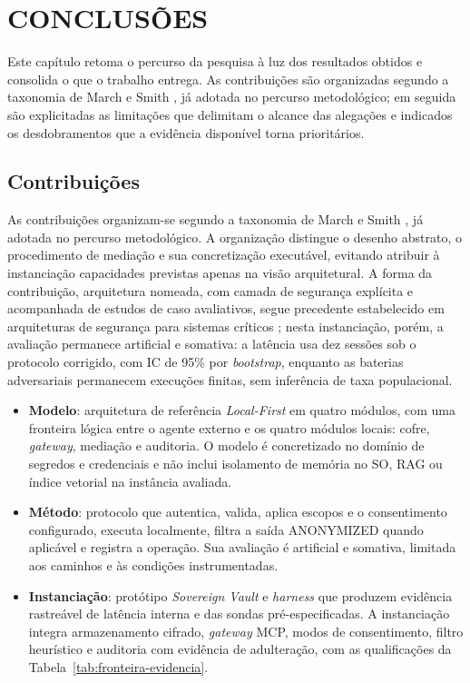 \documentclass[12pt,openright,twoside,a4paper,english,brazil]{abntex2}
\begin{document}
\chapter{CONCLUSÕES}
Este capítulo retoma o percurso da pesquisa à luz dos resultados obtidos e consolida o que o trabalho entrega. As contribuições são organizadas segundo a taxonomia de March e Smith \cite{march1995}, já adotada no percurso metodológico; em seguida são explicitadas as limitações que delimitam o alcance das alegações e indicados os desdobramentos que a evidência disponível torna prioritários.

\section{Contribuições}
As contribuições organizam-se segundo a taxonomia de March e Smith \cite{march1995}, já adotada no percurso metodológico. A organização distingue o desenho abstrato, o procedimento de mediação e sua concretização executável, evitando atribuir à instanciação capacidades previstas apenas na visão arquitetural. A forma da contribuição, arquitetura nomeada, com camada de segurança explícita e acompanhada de estudos de caso avaliativos, segue precedente estabelecido em arquiteturas de segurança para sistemas críticos \cite{pigatto2016}; nesta instanciação, porém, a avaliação permanece artificial e somativa: a latência usa dez sessões sob o protocolo corrigido, com IC de 95\% por \textit{bootstrap}, enquanto as baterias adversariais permanecem execuções finitas, sem inferência de taxa populacional.

\begin{itemize}
\item \textbf{Modelo}: arquitetura de referência \textit{Local-First} em quatro módulos, com uma fronteira lógica entre o agente externo e os quatro módulos locais: cofre, \textit{gateway}, mediação e auditoria. O modelo é concretizado no domínio de segredos e credenciais e não inclui isolamento de memória no SO, RAG ou índice vetorial na instância avaliada.
\item \textbf{Método}: protocolo que autentica, valida, aplica escopos e o consentimento configurado, executa localmente, filtra a saída ANONYMIZED quando aplicável e registra a operação. Sua avaliação é artificial e somativa, limitada aos caminhos e às condições instrumentadas.
\item \textbf{Instanciação}: protótipo \textit{Sovereign Vault} e \textit{harness} que produzem evidência rastreável de latência interna e das sondas pré-especificadas. A instanciação integra armazenamento cifrado, \textit{gateway} MCP, modos de consentimento, filtro heurístico e auditoria com evidência de adulteração, com as qualificações da Tabela~\ref{tab:fronteira-evidencia}.
\end{itemize}
\end{document}
